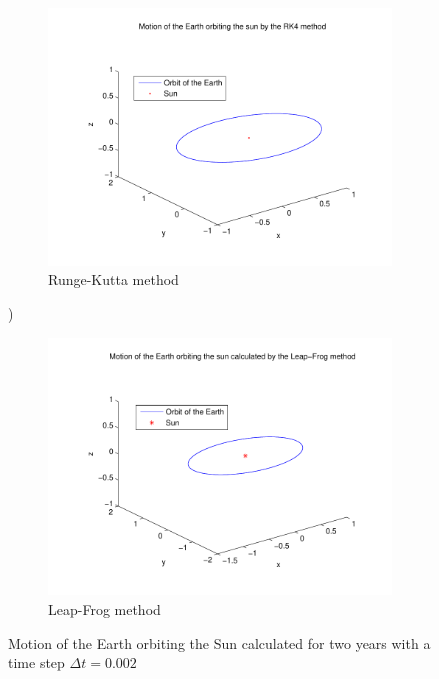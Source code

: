 \documentclass[a4paper,12pt, english]{article}
\begin{document}
\begin{figure}[H]
        \centering
        \begin{subfigure}[b]{0.6\textwidth}
                \includegraphics[width=\textwidth]{RK4_n_1000_t_2.pdf}
                \caption{Runge-Kutta method}
                \label{fig:RK4_dt_0.002}
        \end{subfigure}%
 )
        \begin{subfigure}[b]{0.6\textwidth}
                \includegraphics[width=\textwidth]{LF_n_1000_t_2.pdf}
                \caption{Leap-Frog method}
                \label{fig:LF_dt_0.002}
        \end{subfigure}
        \caption{Motion of the Earth orbiting the Sun calculated for two years with a time step $\Delta t = 0.002$}
\label{dt_0.002}
\end{figure}
\end{document}

